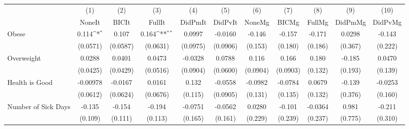{
\def\sym#1{\ifmmode^{#1}\else\(^{#1}\)\fi}
\begin{tabular}{l*{10}{c}}
\toprule
            &\multicolumn{1}{c}{(1)}&\multicolumn{1}{c}{(2)}&\multicolumn{1}{c}{(3)}&\multicolumn{1}{c}{(4)}&\multicolumn{1}{c}{(5)}&\multicolumn{1}{c}{(6)}&\multicolumn{1}{c}{(7)}&\multicolumn{1}{c}{(8)}&\multicolumn{1}{c}{(9)}&\multicolumn{1}{c}{(10)}\\
            &\multicolumn{1}{c}{NoneIt}&\multicolumn{1}{c}{BICIt}&\multicolumn{1}{c}{FullIt}&\multicolumn{1}{c}{DidPmIt}&\multicolumn{1}{c}{DidPvIt}&\multicolumn{1}{c}{NoneMg}&\multicolumn{1}{c}{BICMg}&\multicolumn{1}{c}{FullMg}&\multicolumn{1}{c}{DidPmMg}&\multicolumn{1}{c}{DidPvMg}\\
\midrule
Obese       &       0.114\sym{*}  &       0.107         &       0.164\sym{**} &      0.0997         &     -0.0160         &      -0.146         &      -0.157         &      -0.171         &      0.0298         &      -0.143         \\
            &    (0.0571)         &    (0.0587)         &    (0.0631)         &    (0.0975)         &    (0.0906)         &     (0.153)         &     (0.180)         &     (0.186)         &     (0.367)         &     (0.222)         \\
\addlinespace
Overweight  &      0.0288         &      0.0401         &      0.0473         &     -0.0328         &      0.0788         &       0.116         &       0.166         &       0.180         &      -0.185         &      0.0470         \\
            &    (0.0425)         &    (0.0429)         &    (0.0516)         &    (0.0904)         &    (0.0600)         &    (0.0904)         &    (0.0903)         &     (0.132)         &     (0.193)         &     (0.139)         \\
\addlinespace
Health is Good&    -0.00978         &     -0.0167         &      0.0161         &       0.132         &     -0.0558         &     -0.0982         &     -0.0784         &      0.0679         &      -0.139         &     -0.0253         \\
            &    (0.0612)         &    (0.0624)         &    (0.0676)         &     (0.115)         &    (0.0905)         &     (0.131)         &     (0.135)         &     (0.132)         &     (0.376)         &     (0.160)         \\
\addlinespace
Number of Sick Days&      -0.135         &      -0.154         &      -0.194         &     -0.0751         &     -0.0562         &      0.0280         &      -0.101         &     -0.0364         &       0.981         &      -0.211         \\
            &     (0.109)         &     (0.111)         &     (0.113)         &     (0.165)         &     (0.161)         &     (0.229)         &     (0.239)         &     (0.237)         &     (0.775)         &     (0.310)         \\
\bottomrule
\end{tabular}
}
